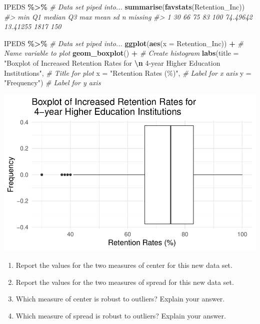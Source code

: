 \documentclass[
]{report}
\newenvironment{Shaded}{\begin{snugshade}}{\end{snugshade}}
\newcommand{\AttributeTok}[1]{\textcolor[rgb]{0.13,0.29,0.53}{#1}}
\newcommand{\CommentTok}[1]{\textcolor[rgb]{0.56,0.35,0.01}{\textit{#1}}}
\newcommand{\FunctionTok}[1]{\textcolor[rgb]{0.13,0.29,0.53}{\textbf{#1}}}
\newcommand{\NormalTok}[1]{#1}
\newcommand{\SpecialCharTok}[1]{\textcolor[rgb]{0.81,0.36,0.00}{\textbf{#1}}}
\newcommand{\StringTok}[1]{\textcolor[rgb]{0.31,0.60,0.02}{#1}}
\begin{document}
\begin{Shaded}
\begin{Highlighting}[]
\NormalTok{IPEDS }\SpecialCharTok{\%\textgreater{}\%} \CommentTok{\# Data set piped into...}
    \FunctionTok{summarise}\NormalTok{(}\FunctionTok{favstats}\NormalTok{(Retention\_Inc))}
\CommentTok{\#\textgreater{}   min Q1 median Q3 max     mean       sd    n missing}
\CommentTok{\#\textgreater{} 1  30 66     75 83 100 74.49642 13.41255 1817     150}

\NormalTok{IPEDS }\SpecialCharTok{\%\textgreater{}\%} \CommentTok{\# Data set piped into...}
    \FunctionTok{ggplot}\NormalTok{(}\FunctionTok{aes}\NormalTok{(}\AttributeTok{x =}\NormalTok{ Retention\_Inc)) }\SpecialCharTok{+} \CommentTok{\# Name variable to plot}
    \FunctionTok{geom\_boxplot}\NormalTok{() }\SpecialCharTok{+} \CommentTok{\# Create histogram }
    \FunctionTok{labs}\NormalTok{(}\AttributeTok{title =} \StringTok{"Boxplot of Increased Retention Rates for }\SpecialCharTok{\textbackslash{}n}\StringTok{ 4{-}year Higher Education Institutions"}\NormalTok{, }
        \CommentTok{\# Title for plot}
        \AttributeTok{x =} \StringTok{"Retention Rates (\%)"}\NormalTok{, }\CommentTok{\# Label for x axis}
        \AttributeTok{y =} \StringTok{"Frequency"}\NormalTok{) }\CommentTok{\# Label for y axis}
\end{Highlighting}
\end{Shaded}

\begin{center}\includegraphics[width=0.7\linewidth]{06-A11-EDA-quantitative_files/figure-latex/unnamed-chunk-5-1} \end{center}

\begin{enumerate}
\def\labelenumi{\arabic{enumi}.}
\setcounter{enumi}{12}
\item
  Report the values for the two measures of center for this new data set.
  \vspace{0.5in}
\item
  Report the values for the two measures of spread for this new data set.
  \vspace{0.5in}
\item
  Which measure of center is robust to outliers? Explain your answer.
  \vspace{0.8in}
\item
  Which measure of spread is robust to outliers? Explain your answer.
  \vspace{0.8in}
\end{enumerate}
\end{document}
